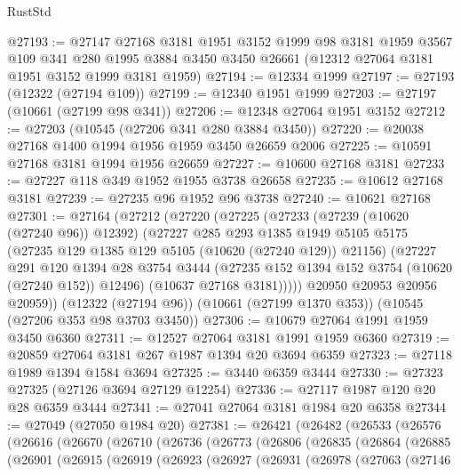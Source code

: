 \begin{lexlean}{RustStd}
\begin{coremodule}
@27193 := @27147
    @27168
    @3181
    @1951
    @3152
    @1999
    @98
    @3181
    @1959
    @3567
    @109
    @341
    @280
    @1995
    @3884
    @3450
    @3450
    @26661
    (@12312 @27064 @3181 @1951 @3152 @1999 @3181 @1959)
@27194 := @12334 @1999
@27197 := @27193 (@12322 (@27194 @109))
@27199 := @12340 @1951 @1999
@27203 := @27197 (@10661 (@27199 @98 @341))
@27206 := @12348 @27064 @1951 @3152
@27212 := @27203 (@10545 (@27206 @341 @280 @3884 @3450))
@27220 := @20038 @27168 @1400 @1994 @1956 @1959 @3450 @26659 @2006
@27225 := @10591 @27168 @3181 @1994 @1956 @26659
@27227 := @10600 @27168 @3181
@27233 := @27227 @118 @349 @1952 @1955 @3738 @26658
@27235 := @10612 @27168 @3181
@27239 := @27235 @96 @1952 @96 @3738
@27240 := @10621 @27168
@27301 := @27164
    (@27212
      (@27220
        (@27225
          (@27233
            (@27239 (@10620 (@27240 @96)) @12392)
            (@27227
              @285
              @293
              @1385
              @1949
              @5105
              @5175
              (@27235 @129 @1385 @129 @5105 (@10620 (@27240 @129)) @21156)
              (@27227
                @291
                @120
                @1394
                @28
                @3754
                @3444
                (@27235 @152 @1394 @152 @3754 (@10620 (@27240 @152)) @12496)
                (@10637 @27168 @3181)))))
        @20950
        @20953
        @20956
        @20959))
    (@12322 (@27194 @96))
    (@10661 (@27199 @1370 @353))
    (@10545 (@27206 @353 @98 @3703 @3450))
@27306 := @10679 @27064 @1991 @1959 @3450 @6360
@27311 := @12527 @27064 @3181 @1991 @1959 @6360
@27319 := @20859 @27064 @3181 @267 @1987 @1394 @20 @3694 @6359
@27323 := @27118 @1989 @1394 @1584 @3694
@27325 := @3440 @6359 @3444
@27330 := @27323 @27325 (@27126 @3694 @27129 @12254)
@27336 := @27117 @1987 @120 @20 @28 @6359 @3444
@27341 := @27041 @27064 @3181 @1984 @20 @6358
@27344 := @27049 (@27050 @1984 @20)
@27381 := @26421
    (@26482
      (@26533
        (@26576
          (@26616
            (@26670
              (@26710
                (@26736
                  (@26773
                    (@26806
                      (@26835
                        (@26864
                          (@26885
                            (@26901
                              (@26915
                                (@26919
                                  (@26923
                                    (@26927
                                      (@26931
                                        (@26978
                                          (@27063
                                            (@27146

\end{coremodule}
\end{lexlean}
